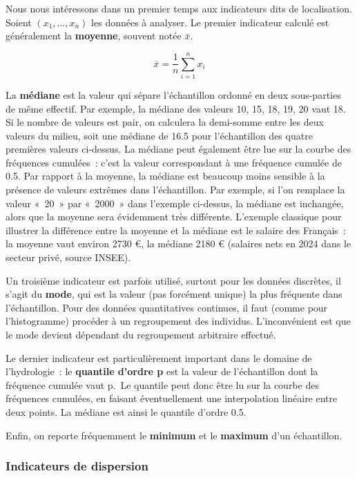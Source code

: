 \documentclass[
]{book}
\begin{document}
Nous nous intéressons dans un premier temps aux indicateurs dits de localisation. Soient \((x_1,\ldots,x_n)\) les données à analyser. Le premier indicateur calculé est généralement la \textbf{moyenne}, souvent notée \(\bar{x}\).

\begin{equation} 
\bar{x}=\frac{1}{n}\sum_{i=1}^{n}x_i
\label{eq:mean}
\end{equation}

La \textbf{médiane} est la valeur qui sépare l'échantillon ordonné en deux sous-parties de même effectif. Par exemple, la médiane des valeurs 10, 15, 18, 19, 20 vaut 18. Si le nombre de valeurs est pair, on calculera la demi-somme entre les deux valeurs du milieu, soit une médiane de 16.5 pour l'échantillon des quatre premières valeurs ci-dessus. La médiane peut également être lue sur la courbe des fréquences cumulées~: c'est la valeur correspondant à une fréquence cumulée de 0.5. Par rapport à la moyenne, la médiane est beaucoup moins sensible à la présence de valeurs extrêmes dans l'échantillon. Par exemple, si l'on remplace la valeur «~20~» par «~2000~» dans l'exemple ci-dessus, la médiane est inchangée, alors que la moyenne sera évidemment très différente. L'exemple classique pour illustrer la différence entre la moyenne et la médiane est le salaire des Français~: la moyenne vaut environ 2730 €, la médiane 2180 € (salaires nets en 2024 dans le secteur privé, source INSEE).

Un troisième indicateur est parfois utilisé, surtout pour les données discrètes, il s'agit du \textbf{mode}, qui est la valeur (pas forcément unique) la plus fréquente dans l'échantillon. Pour des données quantitatives continues, il faut (comme pour l'histogramme) procéder à un regroupement des individus. L'inconvénient est que le mode devient dépendant du regroupement arbitraire effectué.

Le dernier indicateur est particulièrement important dans le domaine de l'hydrologie~: le \textbf{quantile d'ordre p} est la valeur de l'échantillon dont la fréquence cumulée vaut p.~Le quantile peut donc être lu sur la courbe des fréquences cumulées, en faisant éventuellement une interpolation linéaire entre deux points. La médiane est ainsi le quantile d'ordre 0.5.

Enfin, on reporte fréquemment le \textbf{minimum} et le \textbf{maximum} d'un échantillon.

\subsubsection{Indicateurs de dispersion}\label{indicateurs-de-dispersion}
\end{document}
